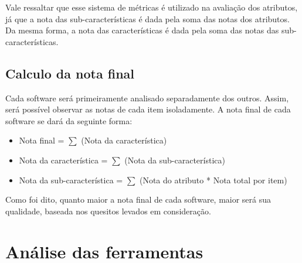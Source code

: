   Vale ressaltar que esse sistema de métricas é utilizado na avaliação dos atributos, já que a nota das sub-características é dada pela
  soma das notas dos atributos. Da mesma forma, a nota das características é dada pela soma das notas das sub-características.

\subsection{Calculo da nota final}

  Cada software será primeiramente analisado separadamente dos outros. Assim, será possível observar as notas de cada item isoladamente.
  A nota final de cada software se dará da seguinte forma:

  \begin{itemize}
    \item Nota final = $\displaystyle\sum$ (Nota da característica)
    \item Nota da característica = $\displaystyle\sum$ (Nota da sub-característica)
    \item Nota da sub-característica = $\displaystyle\sum$ (Nota do atributo * Nota total por item)
  \end{itemize}

  Como foi dito, quanto maior a nota final de cada software, maior será sua qualidade, baseada nos quesitos levados em consideração.

\section{Análise das ferramentas}


